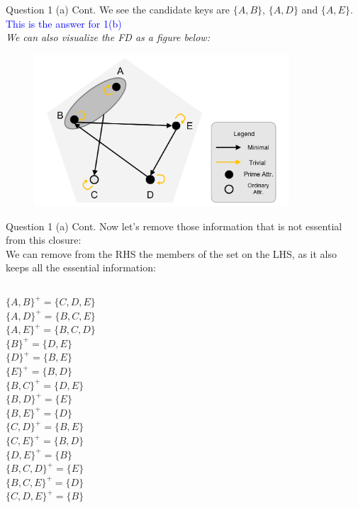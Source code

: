 \begin{frame}[fragile]{Question 1 (a) Cont.}
	We see the candidate keys are $\{A,B\}$, $\{A,D\}$ and $\{A,E\}$.\\
	\textcolor{blue}{This is the answer for 1(b)}\\
	\vspace{15pt}
	\textit{We can also visualize the FD as a figure below:}\\
	\begin{figure}
		\includegraphics[width=0.85\textwidth, trim=0 0 0 0, clip]{4221-t3/images/q1.png}
	\end{figure}
\end{frame}

\begin{frame}[fragile]{Question 1 (a) Cont.}
	Now let's remove those information that is not essential from this closure:\\\vspace{3pt}
	We can remove from the RHS the members of the set on the LHS, as it also keeps all the essential information:\\\vspace{6pt}
	\begin{columns}[t]
		$\{A, B\}^{+}= \{C, D, E\}$\\
		$\{A, D\}^{+}= \{B, C, E\}$\\
		$\{A, E\}^{+}= \{B, C, D\}$\\
		$\{B\}^{+}= \{D, E\}$\\
		$\{D\}^{+}= \{B, E\}$\\
		$\{E\}^{+}= \{B, D\}$\\ 
		$\{B, C\}^{+}= \{D, E\}$\\
		$\{B, D\}^{+}= \{E\}$\\
		$\{B, E\}^{+}= \{D\}$\\
		$\{C, D\}^{+}= \{B, E\}$\\
		$\{C, E\}^{+}= \{B, D\}$\\
		$\{D, E\}^{+}= \{B\}$\\
		$\{B, C, D\}^{+}= \{E\}$\\
		$\{B, C, E\}^{+}= \{D\}$\\
		$\{C, D, E\}^{+}= \{B\}$		
	\end{columns}
\end{frame}

